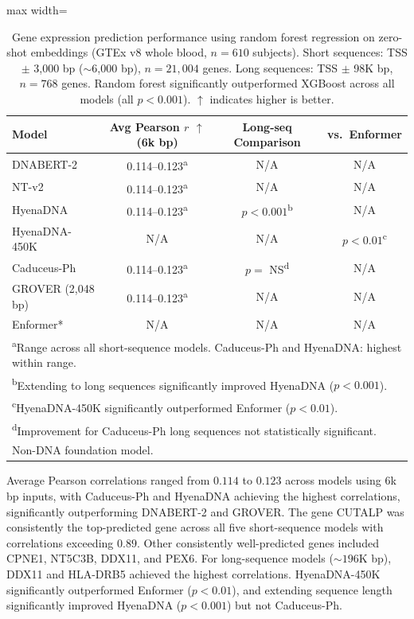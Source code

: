 \documentclass[11pt]{article}
\begin{document}
\begin{table}[htbp]
\centering
\caption{Gene expression prediction performance using random forest regression on zero-shot embeddings (GTEx v8 whole blood, $n = 610$ subjects). Short sequences: TSS $\pm$ 3,000 bp ($\sim$6,000 bp), $n = 21{,}004$ genes. Long sequences: TSS $\pm$ 98K bp, $n = 768$ genes. Random forest significantly outperformed XGBoost across all models (all $p < 0.001$). $\uparrow$ indicates higher is better.}
\label{tab:gene_expression}
\begin{adjustbox}{max width=\textwidth}
\begin{tabular}{lccc}
\toprule
\textbf{Model} & \textbf{Avg Pearson $r$ $\uparrow$ (6k bp)} & \textbf{Long-seq Comparison} & \textbf{vs.\ Enformer} \\
\midrule
DNABERT-2 & 0.114--0.123\textsuperscript{a} & N/A & N/A \\
NT-v2 & 0.114--0.123\textsuperscript{a} & N/A & N/A \\
HyenaDNA & 0.114--0.123\textsuperscript{a} & $p < 0.001$\textsuperscript{b} & N/A \\
HyenaDNA-450K & N/A & N/A & $p < 0.01$\textsuperscript{c} \\
Caduceus-Ph & 0.114--0.123\textsuperscript{a} & $p = $ NS\textsuperscript{d} & N/A \\
GROVER (2,048 bp) & 0.114--0.123\textsuperscript{a} & N/A & N/A \\
Enformer* & N/A & N/A & N/A \\
\bottomrule
\multicolumn{4}{l}{\footnotesize \textsuperscript{a}Range across all short-sequence models. Caduceus-Ph and HyenaDNA: highest within range.} \\
\multicolumn{4}{l}{\footnotesize \textsuperscript{b}Extending to long sequences significantly improved HyenaDNA ($p < 0.001$).} \\
\multicolumn{4}{l}{\footnotesize \textsuperscript{c}HyenaDNA-450K significantly outperformed Enformer ($p < 0.01$).} \\
\multicolumn{4}{l}{\footnotesize \textsuperscript{d}Improvement for Caduceus-Ph long sequences not statistically significant.} \\
\multicolumn{4}{l}{\footnotesize *Non-DNA foundation model.} \\
\end{tabular}
\end{adjustbox}
\end{table}

Average Pearson correlations ranged from $0.114$ to $0.123$ across models using 6k bp inputs, with Caduceus-Ph and HyenaDNA achieving the highest correlations, significantly outperforming DNABERT-2 and GROVER. The gene CUTALP was consistently the top-predicted gene across all five short-sequence models with correlations exceeding $0.89$. Other consistently well-predicted genes included CPNE1, NT5C3B, DDX11, and PEX6. For long-sequence models (${\sim}196$K bp), DDX11 and HLA-DRB5 achieved the highest correlations. HyenaDNA-450K significantly outperformed Enformer ($p < 0.01$), and extending sequence length significantly improved HyenaDNA ($p < 0.001$) but not Caduceus-Ph.
\end{document}
